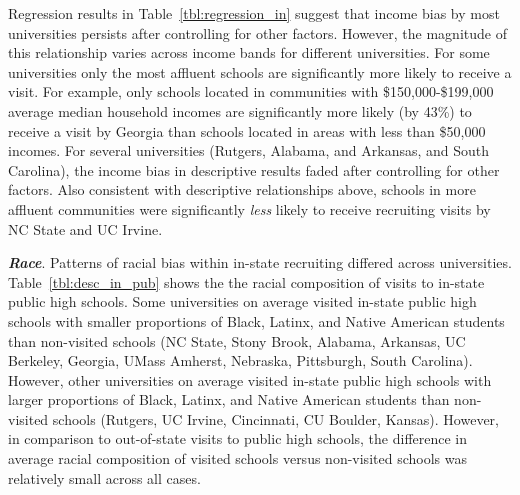 \documentclass[twoside]{article}
\begin{document}
Regression results in Table~\ref{tbl:regression_in} suggest that income bias by most universities persists after controlling for other factors. However, the magnitude of this relationship varies across income bands for different universities. For some universities only the most affluent schools are significantly more likely to receive a visit. For example, only schools located in communities with \$150,000-\$199,000 average median household incomes are significantly more likely (by 43\%) to receive a visit by Georgia than schools located in areas with less than \$50,000 incomes. For several universities (Rutgers, Alabama, and Arkansas, and South Carolina), the income bias in descriptive results faded after controlling for other factors. Also consistent with descriptive relationships above, schools in more affluent communities were significantly \textit{less} likely to receive recruiting visits by NC State and UC Irvine.

\textbf{\textit{Race}}. Patterns of racial bias within in-state recruiting differed across universities. Table~\ref{tbl:desc_in_pub} shows the the racial composition of visits to in-state public high schools. Some universities on average visited in-state public high schools with smaller proportions of Black, Latinx, and Native American students than non-visited schools (NC State, Stony Brook, Alabama, Arkansas, UC Berkeley, Georgia, UMass Amherst, Nebraska, Pittsburgh, South Carolina). However, other universities on average visited in-state public high schools with larger proportions of Black,  Latinx, and Native American students than non-visited schools (Rutgers, UC Irvine, Cincinnati, CU Boulder, Kansas). However, in comparison to out-of-state visits to public high schools, the difference in average racial composition of visited schools versus non-visited schools was relatively small across all cases.

\end{document}

